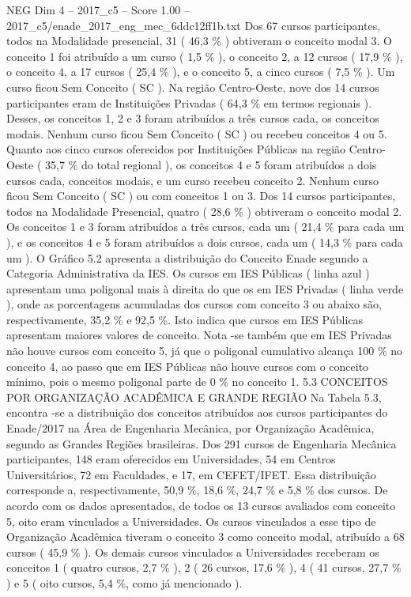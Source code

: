 \begin{textsample}{NEG Dim 4 – 2017\_c5 – Score 1.00 – 2017\_c5/enade\_2017\_eng\_mec\_6ddc12ff1b.txt}
Dos 67 cursos participantes, todos na Modalidade presencial, 31 ( 46,3 \% ) obtiveram o conceito modal 3.
O conceito 1 foi atribuído a um curso ( 1,5 \% ), o conceito 2, a 12 cursos ( 17,9 \% ), o conceito 4, a 17 cursos ( 25,4 \% ), e o conceito 5, a cinco cursos ( 7,5 \% ).
Um curso ficou Sem Conceito ( SC ).
Na região Centro-Oeste, nove dos 14 cursos participantes eram de Instituições Privadas ( 64,3 \% em termos regionais ).
Desses, os conceitos 1, 2 e 3 foram atribuídos a três cursos cada, os conceitos modais.
Nenhum curso ficou Sem Conceito ( SC ) ou recebeu conceitos 4 ou 5.
Quanto aos cinco cursos oferecidos por Instituições Públicas na região Centro-Oeste ( 35,7 \% do total regional ), os conceitos 4 e 5 foram atribuídos a dois cursos cada, conceitos modais, e um curso recebeu conceito 2.
Nenhum curso ficou Sem Conceito ( SC ) ou com conceitos 1 ou 3.
Dos 14 cursos participantes, todos na Modalidade Presencial, quatro ( 28,6 \% ) obtiveram o conceito modal 2.
Os conceitos 1 e 3 foram atribuídos a três cursos, cada um ( 21,4 \% para cada um ), e os conceitos 4 e 5 foram atribuídos a dois cursos, cada um ( 14,3 \% para cada um ).
O Gráfico 5.2 apresenta a distribuição do Conceito Enade segundo a Categoria Administrativa da IES.
Os cursos em IES Públicas ( linha azul ) apresentam uma poligonal mais à direita do que os em IES Privadas ( linha verde ), onde as porcentagens acumuladas dos cursos com conceito 3 ou abaixo são, respectivamente, 35,2 \% e 92,5 \%.
Isto indica que cursos em IES Públicas apresentam maiores valores de conceito.
Nota -se também que em IES Privadas não houve cursos com conceito 5, já que o poligonal cumulativo alcança 100 \% no conceito 4, ao passo que em IES Públicas não houve cursos com o conceito mínimo, pois o mesmo poligonal parte de 0 \% no conceito 1. 5.3 CONCEITOS POR ORGANIZAÇÃO ACADÊMICA E GRANDE REGIÃO Na Tabela 5.3, encontra -se a distribuição dos conceitos atribuídos aos cursos participantes do Enade/2017 na Área de Engenharia Mecânica, por Organização Acadêmica, segundo as Grandes Regiões brasileiras.
Dos 291 cursos de Engenharia Mecânica participantes, 148 eram oferecidos em Universidades, 54 em Centros Universitários, 72 em Faculdades, e 17, em CEFET/IFET.
Essa distribuição corresponde a, respectivamente, 50,9 \%, 18,6 \%, 24,7 \% e 5,8 \% dos cursos.
De acordo com os dados apresentados, de todos os 13 cursos avaliados com conceito 5, oito eram vinculados a Universidades.
Os cursos vinculados a esse tipo de Organização Acadêmica tiveram o conceito 3 como conceito modal, atribuído a 68 cursos ( 45,9 \% ).
Os demais cursos vinculados a Universidades receberam os conceitos 1 ( quatro cursos, 2,7 \% ), 2 ( 26 cursos, 17,6 \% ), 4 ( 41 cursos, 27,7 \% ) e 5 ( oito cursos, 5,4 \%, como já mencionado ).

\end{textsample}
